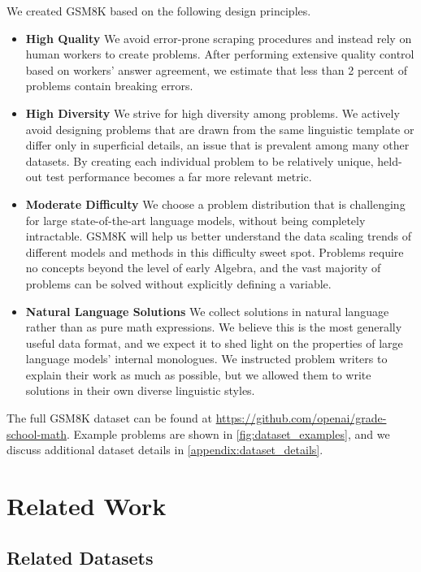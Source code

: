 We created GSM8K based on the following design principles.

\begin{itemize}
    \item \textbf{High Quality} We avoid error-prone scraping procedures and instead rely on human workers to create problems. After performing extensive quality control based on workers' answer agreement, we estimate that less than 2 percent of problems contain breaking errors.
    \item \textbf{High Diversity} We strive for high diversity among problems. We actively avoid designing problems that are drawn from the same linguistic template or differ only in superficial details, an issue that is prevalent among many other datasets. By creating each individual problem to be relatively unique, held-out test performance becomes a far more relevant metric.
    \item \textbf{Moderate Difficulty} We choose a problem distribution that is challenging for large state-of-the-art language models, without being completely intractable. GSM8K will help us better understand the data scaling trends of different models and methods in this difficulty sweet spot. Problems require no concepts beyond the level of early Algebra, and the vast majority of problems can be solved without explicitly defining a variable.
    \item \textbf{Natural Language Solutions} We collect solutions in natural language rather than as pure math expressions. We believe this is the most generally useful data format, and we expect it to shed light on the properties of large language models’ internal monologues. We instructed problem writers to explain their work as much as possible, but we allowed them to write solutions in their own diverse linguistic styles. 
\end{itemize}

The full GSM8K dataset can be found at \href{https://github.com/openai/grade-school-math}{https://github.com/openai/grade-school-math}. Example problems are shown in \ref{fig:dataset_examples}, and we discuss additional dataset details in \ref{appendix:dataset_details}.

\section{Related Work} \label{section:related}

\subsection{Related Datasets} 

